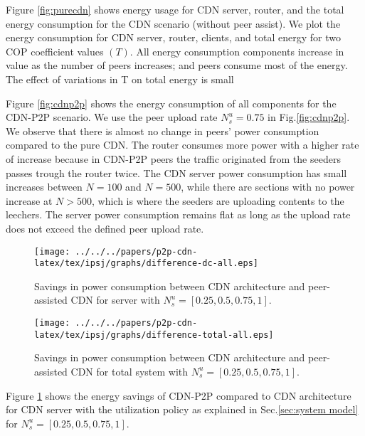 Figure \ref{fig:purecdn} shows energy usage for CDN server, router, and the total energy consumption for the CDN scenario (without peer assist). 
We plot the energy consumption for CDN server, router, clients, and total energy for two COP coefficient values $(T)$.  
All energy consumption components increase in value as the number of peers increases; and peers consume most of the energy. 
The effect of variations in T on total energy is small

Figure \ref{fig:cdnp2p} shows the energy consumption of all components for the CDN-P2P scenario. 
We use the peer upload rate $N_s^u=0.75$ in Fig.\ref{fig:cdnp2p}. 
We observe that there is almost no change in peers’ power consumption compared to the pure CDN. 
The router consumes more power with a higher rate of increase because in CDN-P2P peers the traffic originated from the seeders passes trough the router twice.  
The CDN server power consumption has small increases between $N=100$ and $N=500$, while there are sections with no power increase at $N > 500$, which is where the seeders are uploading contents to the leechers. 
The server power consumption remains flat as long as the upload rate does not exceed the defined peer upload rate.



\begin{figure}[tb]
\begin{center}
\texttt{[image: ../../../papers/p2p-cdn-latex/tex/ipsj/graphs/difference-dc-all.eps]}
\end{center}
\caption{Savings in power consumption between CDN architecture and peer-assisted CDN for server with $N_s^u=[0.25,0.5,0.75,1]$.}
\label{fig:diffdc}
\vspace{-2mm}
\end{figure} 

\begin{figure}[tb]
\begin{center}
\texttt{[image: ../../../papers/p2p-cdn-latex/tex/ipsj/graphs/difference-total-all.eps]}
\end{center}
\caption{Savings in power consumption between CDN architecture and peer-assisted CDN for total system with $N_s^u=[0.25,0.5,0.75,1]$.}
\label{fig:difftotal}
\vspace{-2mm}
\end{figure} 

Figure \ref{fig:diffdc} shows the energy savings of CDN-P2P compared to CDN architecture for CDN server with the utilization policy as explained in Sec.\ref{sec:system model} for $N_s^u=[0.25,0.5,0.75,1]$. 

